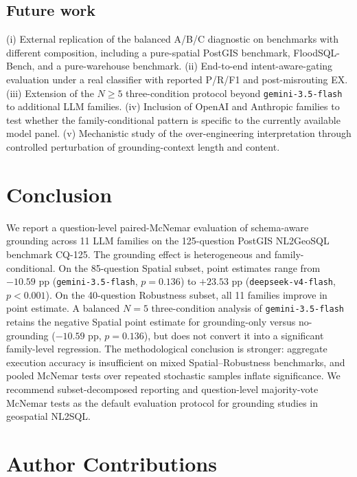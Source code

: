 \documentclass[11pt]{article}
\begin{document}
\subsection{Future work}

(i) External replication of the balanced A/B/C diagnostic on benchmarks with different composition, including a pure-spatial PostGIS benchmark, FloodSQL-Bench, and a pure-warehouse benchmark. (ii) End-to-end intent-aware-gating evaluation under a real classifier with reported P/R/F1 and post-misrouting EX. (iii) Extension of the $N{\geq}5$ three-condition protocol beyond \texttt{gemini-3.5-flash} to additional LLM families. (iv) Inclusion of OpenAI and Anthropic families to test whether the family-conditional pattern is specific to the currently available model panel. (v) Mechanistic study of the over-engineering interpretation through controlled perturbation of grounding-context length and content.

\section{Conclusion}
\label{sec:conclusion}

We report a question-level paired-McNemar evaluation of schema-aware grounding across 11 LLM families on the 125-question PostGIS NL2GeoSQL benchmark CQ-125. The grounding effect is heterogeneous and family-conditional. On the 85-question Spatial subset, point estimates range from $-10.59$ pp (\texttt{gemini-3.5-flash}, $p=0.136$) to $+23.53$ pp (\texttt{deepseek-v4-flash}, $p<0.001$). On the 40-question Robustness subset, all 11 families improve in point estimate. A balanced $N{=}5$ three-condition analysis of \texttt{gemini-3.5-flash} retains the negative Spatial point estimate for grounding-only versus no-grounding ($-10.59$ pp, $p=0.136$), but does not convert it into a significant family-level regression. The methodological conclusion is stronger: aggregate execution accuracy is insufficient on mixed Spatial--Robustness benchmarks, and pooled McNemar tests over repeated stochastic samples inflate significance. We recommend subset-decomposed reporting and question-level majority-vote McNemar tests as the default evaluation protocol for grounding studies in geospatial NL2SQL.

\section*{Author Contributions}
\end{document}
